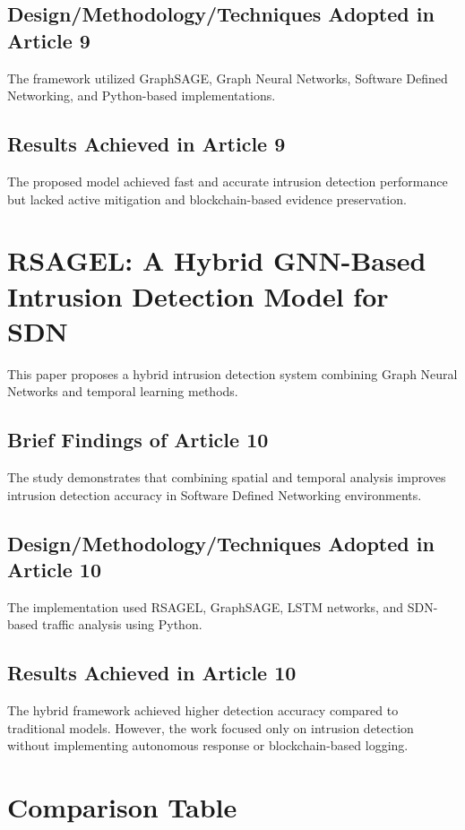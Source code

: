 \documentclass[12pt,a4paper]{report}
\begin{document}
\subsection{Design/Methodology/Techniques Adopted in Article 9}
The framework utilized GraphSAGE, Graph Neural Networks, Software Defined Networking, and Python-based implementations.

\subsection{Results Achieved in Article 9}
The proposed model achieved fast and accurate intrusion detection performance but lacked active mitigation and blockchain-based evidence preservation.

\section{RSAGEL: A Hybrid GNN-Based Intrusion Detection Model for SDN \cite{paper10}}
This paper proposes a hybrid intrusion detection system combining Graph Neural Networks and temporal learning methods.

\subsection{Brief Findings of Article 10}
The study demonstrates that combining spatial and temporal analysis improves intrusion detection accuracy in Software Defined Networking environments.

\subsection{Design/Methodology/Techniques Adopted in Article 10}
The implementation used RSAGEL, GraphSAGE, LSTM networks, and SDN-based traffic analysis using Python.

\subsection{Results Achieved in Article 10}
The hybrid framework achieved higher detection accuracy compared to traditional models. However, the work focused only on intrusion detection without implementing autonomous response or blockchain-based logging.

\newpage
\section{Comparison Table}
\end{document}
